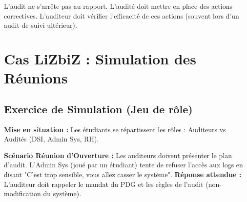 L'audit ne s'arrête pas au rapport. L'audité doit mettre en place des actions correctives. L'auditeur doit vérifier l'efficacité de ces actions (souvent lors d'un audit de suivi ultérieur).

\section{Cas LiZbiZ : Simulation des Réunions}

\subsection{Exercice de Simulation (Jeu de rôle)}

\begin{boxlizbiz}
\textbf{Mise en situation :}
Les étudiants se répartissent les rôles : Auditeurs vs Audités (DSI, Admin Sys, RH).

\textbf{Scénario Réunion d'Ouverture :}
Les auditeurs doivent présenter le plan d'audit. L'Admin Sys (joué par un étudiant) tente de refuser l'accès aux logs en disant "C'est trop sensible, vous allez casser le système".
\textbf{Réponse attendue :} L'auditeur doit rappeler le mandat du PDG et les règles de l'audit (non-modification du système).
\end{boxlizbiz}

